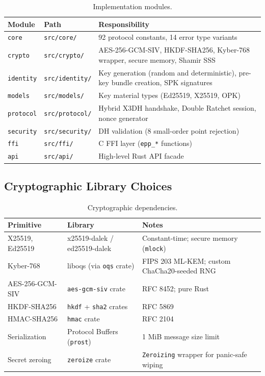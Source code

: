 \documentclass[11pt,a4paper]{article}
\theoremstyle{definition}
\begin{document}
\begin{table}[H]
\centering
\caption{Implementation modules.}\label{tab:modules}
\small
\begin{tabular}{@{}llp{8cm}@{}}
\toprule
Module & Path & Responsibility \\
\midrule
\texttt{core} & \texttt{src/core/} & 92 protocol constants, 14 error type variants \\
\texttt{crypto} & \texttt{src/crypto/} & AES-256-GCM-SIV, HKDF-SHA256, Kyber-768 wrapper, secure memory, Shamir SSS \\
\texttt{identity} & \texttt{src/identity/} & Key generation (random and deterministic), pre-key bundle creation, SPK signatures \\
\texttt{models} & \texttt{src/models/} & Key material types (Ed25519, X25519, OPK) \\
\texttt{protocol} & \texttt{src/protocol/} & Hybrid X3DH handshake, Double Ratchet session, nonce generator \\
\texttt{security} & \texttt{src/security/} & DH validation (8 small-order point rejection) \\
\texttt{ffi} & \texttt{src/ffi/} & C FFI layer (\texttt{epp\_*} functions) \\
\texttt{api} & \texttt{src/api/} & High-level Rust API facade \\
\bottomrule
\end{tabular}
\end{table}

\subsection{Cryptographic Library Choices}

\begin{table}[H]
\centering
\caption{Cryptographic dependencies.}\label{tab:deps}
\small
\begin{tabular}{@{}lll@{}}
\toprule
Primitive & Library & Notes \\
\midrule
X25519, Ed25519 & x25519-dalek / ed25519-dalek & Constant-time; secure memory (\texttt{mlock}) \\
Kyber-768 & liboqs (via \texttt{oqs} crate) & FIPS 203 ML-KEM; custom ChaCha20-seeded RNG \\
AES-256-GCM-SIV & \texttt{aes-gcm-siv} crate & RFC 8452; pure Rust \\
HKDF-SHA256 & \texttt{hkdf} + \texttt{sha2} crates & RFC 5869 \\
HMAC-SHA256 & \texttt{hmac} crate & RFC 2104 \\
Serialization & Protocol Buffers (\texttt{prost}) & 1 MiB message size limit \\
Secret zeroing & \texttt{zeroize} crate & \texttt{Zeroizing} wrapper for panic-safe wiping \\
\bottomrule
\end{tabular}
\end{table}
\end{document}
